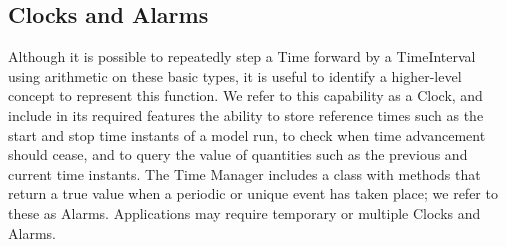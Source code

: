 \subsection{Clocks and Alarms}
Although it is possible to repeatedly step a Time forward by a 
TimeInterval using arithmetic on these basic types, it is useful to 
identify a higher-level concept to represent this function.  We refer to 
this capability as a Clock, and include in its required features the 
ability to store reference times such as the start and stop time 
instants of a model run, to check when time advancement should cease, 
and to query the value of quantities such as the previous and current 
time instants.  The Time Manager includes a class with methods that 
return a true value when a periodic or unique event has taken place; 
we refer to these as Alarms.  Applications may require temporary 
or multiple Clocks and Alarms.  











